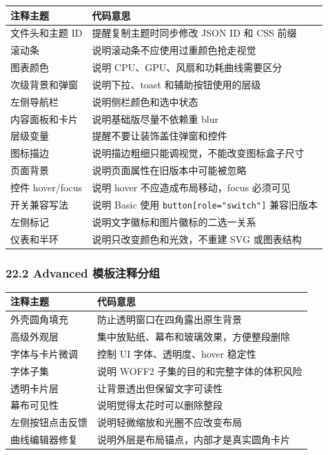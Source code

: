 \documentclass[UTF8,11pt,a4paper]{ctexart}
\begin{document}
\begin{longtable}[]{@{}L{0.36\textwidth}L{0.58\textwidth}@{}}
\toprule\noalign{}
注释主题 & 代码意思 \\
\midrule\noalign{}
\endhead
\bottomrule\noalign{}
\endlastfoot
文件头和主题 ID & 提醒复制主题时同步修改 JSON ID 和 CSS 前缀 \\
滚动条 & 说明滚动条不应使用过重颜色抢走视觉 \\
图表颜色 & 说明 CPU、GPU、风扇和功耗曲线需要区分 \\
次级背景和弹窗 & 说明下拉、toast 和辅助按钮使用的层级 \\
左侧导航栏 & 说明侧栏颜色和选中状态 \\
内容面板和卡片 & 说明基础版尽量不依赖重 blur \\
层级变量 & 提醒不要让装饰盖住弹窗和控件 \\
图标描边 & 说明描边粗细只能调视觉，不能改变图标盒子尺寸 \\
页面背景 & 说明页面属性在旧版本中可能被忽略 \\
控件 hover/focus & 说明 hover 不应造成布局移动，focus 必须可见 \\
开关兼容写法 & 说明 Basic 使用 \texttt{button{[}role="switch"{]}}
兼容旧版本 \\
左侧标记 & 说明文字徽标和图片徽标的二选一关系 \\
仪表和半环 & 说明只改变颜色和光效，不重建 SVG 或图表结构 \\
\end{longtable}

\subsubsection{22.2 Advanced
模板注释分组}\label{222-advanced-ux6a21ux677fux6ce8ux91caux5206ux7ec4}

\begin{longtable}[]{@{}L{0.36\textwidth}L{0.58\textwidth}@{}}
\toprule\noalign{}
注释主题 & 代码意思 \\
\midrule\noalign{}
\endhead
\bottomrule\noalign{}
\endlastfoot
外壳圆角填充 & 防止透明窗口在四角露出原生背景 \\
高级外观层 & 集中放贴纸、幕布和玻璃效果，方便整段删除 \\
字体与卡片微调 & 控制 UI 字体、透明度、hover 稳定性 \\
字体子集 & 说明 WOFF2 子集的目的和完整字体的体积风险 \\
透明卡片层 & 让背景透出但保留文字可读性 \\
幕布可见性 & 说明觉得太花时可以删除整段 \\
左侧按钮点击反馈 & 说明轻微缩放和光圈不应改变布局 \\
曲线编辑器修复 & 说明外层是布局锚点，内部才是真实圆角卡片 \\
\end{longtable}
\end{document}
